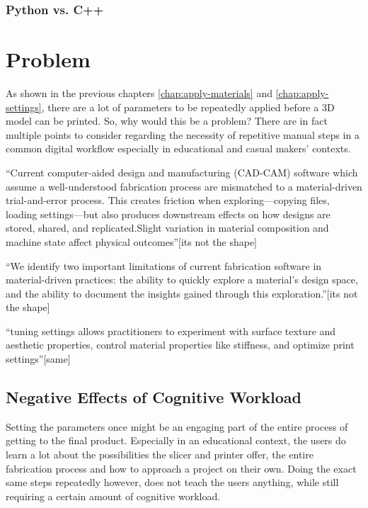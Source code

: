 \subsection{Python vs. C++}



\chapter{Problem}\label{ch:problem}

As shown in the previous chapters \ref{chap:apply-materials} and \ref{chap:apply-settings}, there are a lot of parameters to be repeatedly applied before a 3D model can be printed. 
So, why would this be a problem? 
There are in fact multiple points to consider regarding the necessity of repetitive manual steps in a common digital workflow especially in educational and casual makers' contexts. 

``Current computer-aided design and manufacturing (CAD-CAM) software which assume a well-understood fabrication process are mismatched to a material-driven trial-and-error process. This creates friction when exploring—copying files, loading settings—but also produces downstream effects on how designs are stored, shared, and replicated.Slight variation in material composition and machine state affect physical outcomes''[its not the shape]

``We identify two important limitations of current fabrication software in material-driven practices: the ability to quickly explore a material’s design space, and the ability to document the insights gained through this exploration.''[its not the shape]

``tuning settings allows practitioners to experiment with surface texture and aesthetic properties, control material properties like stiffness, and optimize print settings''[same]

\section{Negative Effects of Cognitive Workload}

Setting the parameters once might be an engaging part of the entire process of getting to the final product. 
Especially in an educational context, the users do learn a lot about the possibilities the slicer and printer offer, the entire fabrication process and how to approach a project on their own. 
Doing the exact same steps repeatedly however, does not teach the users anything, while still requiring a certain amount of cognitive workload. 

